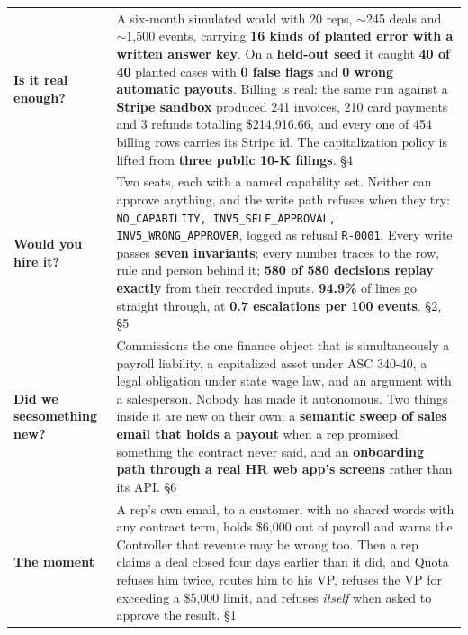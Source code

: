 \documentclass[10pt,a4paper]{article}
\newcommand{\gy}[1]{{\color{qgrey}#1}}
\newcommand{\code}[1]{{\small\texttt{#1}}}
\begin{document}
\vspace{4pt}
\renewcommand{\arraystretch}{1.25}
\begin{tabularx}{\textwidth}{@{}p{34mm}X@{}}
\toprule
\textbf{Is it real enough?} &
A six-month simulated world with 20 reps, $\sim$245 deals and $\sim$1{,}500 events, carrying \textbf{16 kinds of planted error with a written answer key}. On a \textbf{held-out seed} it caught \textbf{40 of 40} planted cases with \textbf{0 false flags} and \textbf{0 wrong automatic payouts}. Billing is real: the same run against a \textbf{Stripe sandbox} produced 241 invoices, 210 card payments and 3 refunds totalling \$214{,}916.66, and every one of 454 billing rows carries its Stripe id. The capitalization policy is lifted from \textbf{three public 10-K filings}. \hfill\gy{\S4}\\
\textbf{Would you hire it?} &
Two seats, each with a named capability set. Neither can approve anything, and the write path refuses when they try: \code{NO\_CAPABILITY, INV5\_SELF\_APPROVAL, INV5\_WRONG\_APPROVER}, logged as refusal \code{R-0001}. Every write passes \textbf{seven invariants}; every number traces to the row, rule and person behind it; \textbf{580 of 580 decisions replay exactly} from their recorded inputs. \textbf{94.9\%} of lines go straight through, at \textbf{0.7 escalations per 100 events}. \hfill\gy{\S2, \S5}\\
\textbf{Did we see\newline something new?} &
Commissions \textemdash{} the one finance object that is simultaneously a payroll liability, a capitalized asset under ASC 340-40, a legal obligation under state wage law, and an argument with a salesperson. Nobody has made it autonomous. Two things inside it are new on their own: a \textbf{semantic sweep of sales email that holds a payout} when a rep promised something the contract never said, and an \textbf{onboarding path through a real HR web app's screens} rather than its API. \hfill\gy{\S6}\\
\textbf{The moment} &
A rep's own email, to a customer, with no shared words with any contract term, holds \$6{,}000 out of payroll and warns the Controller that revenue may be wrong too. Then a rep claims a deal closed four days earlier than it did, and Quota refuses him twice, routes him to his VP, refuses the VP for exceeding a \$5{,}000 limit, and refuses \emph{itself} when asked to approve the result. \hfill\gy{\S1}\\
\bottomrule
\end{tabularx}
\end{document}
